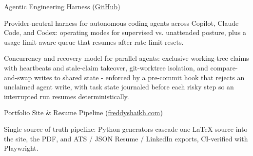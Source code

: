 
\begin{cventries}

  \cventry
    {}
    {Agentic Engineering Harness (\href{https://github.com/Freddy-S3/agent-agnostic-harness}{GitHub})}
    {}
    {}
    {
      \begin{cvitems}
        \item {Provider-neutral harness for autonomous coding agents across Copilot, Claude Code, and Codex: operating modes for supervised vs. unattended posture, plus a usage-limit-aware queue that resumes after rate-limit resets.}
        \item {Concurrency and recovery model for parallel agents: exclusive working-tree claims with heartbeats and stale-claim takeover, git-worktree isolation, and compare-and-swap writes to shared state - enforced by a pre-commit hook that rejects an unclaimed agent write, with task state journaled before each risky step so an interrupted run resumes deterministically.}
      \end{cvitems}
    }

  \cventry
    {}
    {Portfolio Site \& Resume Pipeline (\href{https://freddyshaikh.com}{freddyshaikh.com})}
    {}
    {}
    {
      \begin{cvitems}
        \item {Single-source-of-truth pipeline: Python generators cascade one LaTeX source into the site, the PDF, and ATS / JSON Resume / LinkedIn exports, CI-verified with Playwright.}
      \end{cvitems}
    }

\end{cventries}
